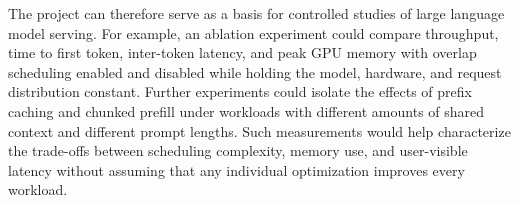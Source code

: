\documentclass[12pt,a4paper]{article}
\begin{document}
The project can therefore serve as a basis for controlled studies of large language model serving. For example, an ablation experiment could compare throughput, time to first token, inter-token latency, and peak GPU memory with overlap scheduling enabled and disabled while holding the model, hardware, and request distribution constant. Further experiments could isolate the effects of prefix caching and chunked prefill under workloads with different amounts of shared context and different prompt lengths. Such measurements would help characterize the trade-offs between scheduling complexity, memory use, and user-visible latency without assuming that any individual optimization improves every workload.
\end{document}
